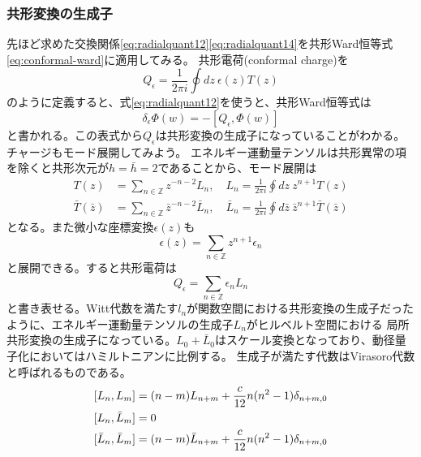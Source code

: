\documentclass[11pt, aps, longbibliography]{article}
\numberwithin{equation}{section}
\begin{document}
    \subsubsection{共形変換の生成子}
        先ほど求めた交換関係\eqref{eq:radialquant12}\eqref{eq:radialquant14}を共形Ward恒等式\eqref{eq:conformal-ward}に適用してみる。
        共形電荷(conformal charge)を
        \begin{equation}\label{eq:virasoro1}
            Q_\epsilon = \frac{1}{2\pi i}\oint dz \ \epsilon(z)T(z)
        \end{equation}
        のように定義すると、式\eqref{eq:radialquant12}を使うと、共形Ward恒等式は
        \begin{equation}\label{eq:virasoro2}
            \delta_\epsilon \Phi(w) = -\left[ Q_\epsilon, \Phi(w) \right]
        \end{equation}
        と書かれる。この表式から$Q_\epsilon$は共形変換の生成子になっていることがわかる。
        チャージもモード展開してみよう。
        エネルギー運動量テンソルは共形異常の項を除くと共形次元が$h=\bar{h}=2$であることから、モード展開は
        \begin{align}\label{eq:virasoro3}
            T(z) &= \sum_{n\in \mathbb{Z}} z^{-n-2}L_n, \quad L_n = \frac{1}{2\pi i}\oint dz \ z^{n+1}T(z) \\
            \bar{T}(\bar{z}) &= \sum_{n\in \mathbb{Z}} \bar{z}^{-n-2}\bar{L}_n, \quad \bar{L}_n = \frac{1}{2\pi i}\oint d\bar{z} \ \bar{z}^{n+1}\bar{T}(\bar{z})
        \end{align}
        となる。また微小な座標変換$\epsilon(z)$も
        \begin{equation}\label{eq:virasoro4}
            \epsilon(z) = \sum_{n\in \mathbb{Z}}z^{n+1}\epsilon_n
        \end{equation}
        と展開できる。すると共形電荷は
        \begin{equation}\label{eq:virasoro5}
            Q_\epsilon = \sum_{n\in \mathbb{Z}} \epsilon_{n}L_n
        \end{equation}
        と書き表せる。Witt代数を満たす$l_n$が関数空間における共形変換の生成子だったように、エネルギー運動量テンソルの生成子$L_n$がヒルベルト空間における
        局所共形変換の生成子になっている。$L_0 + \bar{L}_0$はスケール変換となっており、動径量子化においてはハミルトニアンに比例する。
        生成子が満たす代数はVirasoro代数と呼ばれるものである。
        \begin{align}\label{eq:virasoro6}
            [L_n, L_m] &= (n-m)L_{n+m} + \frac{c}{12}n(n^2-1)\delta_{n+m, 0} \notag \\
            [L_n, \bar{L}_m] &= 0 \\
            [\bar{L}_n, \bar{L}_m] &= (n-m)\bar{L}_{n+m} + \frac{c}{12}n(n^2-1)\delta_{n+m, 0} \notag
        \end{align}
\end{document}
